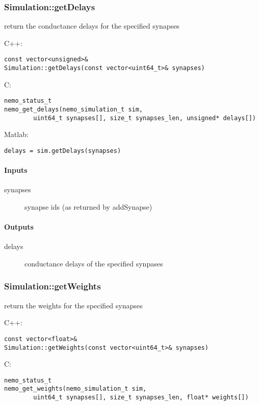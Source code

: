 \clearpage
\subsubsection*{Simulation::getDelays}
\label{fn: getDelays}
return the conductance delays for the specified synapses


\noindent C++:
\begin{lstlisting}[aboveskip=2pt]
const vector<unsigned>&
Simulation::getDelays(const vector<uint64_t>& synapses)
\end{lstlisting}

\noindent C:
\begin{lstlisting}[aboveskip=2pt]
nemo_status_t
nemo_get_delays(nemo_simulation_t sim, 
        uint64_t synapses[], size_t synapses_len, unsigned* delays[])
\end{lstlisting}

\noindent Matlab:
\begin{lstlisting}[aboveskip=2pt]
delays = sim.getDelays(synapses)
\end{lstlisting}
\paragraph{Inputs}
\begin{description}
\item[synapses] synapse ids (as returned by addSynapse)
\end{description}
\paragraph{Outputs}
\begin{description}
\item[delays] conductance delays of the specified synpases
\end{description}

\clearpage
\subsubsection*{Simulation::getWeights}
\label{fn: getWeights}
return the weights for the specified synapses


\noindent C++:
\begin{lstlisting}[aboveskip=2pt]
const vector<float>&
Simulation::getWeights(const vector<uint64_t>& synapses)
\end{lstlisting}

\noindent C:
\begin{lstlisting}[aboveskip=2pt]
nemo_status_t
nemo_get_weights(nemo_simulation_t sim, 
        uint64_t synapses[], size_t synapses_len, float* weights[])
\end{lstlisting}

